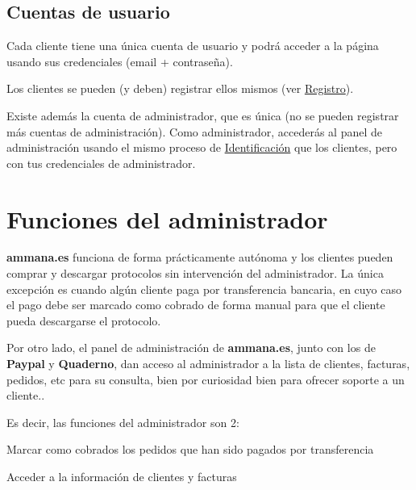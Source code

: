 \documentclass[12pt, spanish]{article}
\begin{document}

    \subsection{Cuentas de usuario}

        Cada cliente tiene una única cuenta de usuario y podrá acceder a la página usando
    sus credenciales (email + contraseña).

        Los clientes se pueden (y deben) registrar ellos mismos (ver \hyperref[sec:registro]{Registro}).
    
        Existe además la cuenta de administrador, que es única (no se pueden registrar
    más cuentas de administración). Como administrador, accederás al panel de administración
    usando el mismo proceso de \hyperref[sec:login]{Identificación} que los clientes, pero con
    tus credenciales de administrador.


    \newpage

    \section{Funciones del administrador}

            \textbf{ammana.es} funciona de forma prácticamente autónoma y los clientes pueden
        comprar y descargar protocolos sin intervención del administrador. La única
        excepción es cuando algún cliente paga por transferencia bancaria, en cuyo
        caso el pago debe ser marcado como cobrado de forma manual para que el cliente
        pueda descargarse el protocolo.

            Por otro lado, el panel de administración de \textbf{ammana.es}, junto con los de
        \textbf{Paypal} y \textbf{Quaderno}, dan acceso al administrador a la lista de clientes,
        facturas, pedidos, etc para su consulta, bien por curiosidad bien para ofrecer soporte
        a un cliente..

        Es decir, las funciones del administrador son 2:

        \begin{steps}
            \item Marcar como cobrados los pedidos que han sido pagados por transferencia
            \item Acceder a la información de clientes y facturas
        \end{steps}
\end{document}

